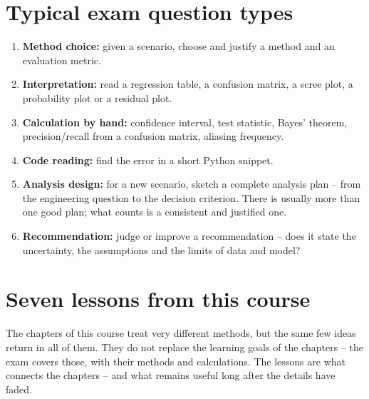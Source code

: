 \documentclass[
  letterpaper,
  DIV=11,
  numbers=noendperiod]{scrreprt}
\providecommand{\tightlist}{%
  \setlength{\itemsep}{0pt}\setlength{\parskip}{0pt}}\usepackage{longtable,booktabs,array}
\begin{document}
\section{Typical exam question types}\label{typical-exam-question-types}

\begin{enumerate}
\def\labelenumi{\arabic{enumi}.}
\tightlist
\item
  \textbf{Method choice:} given a scenario, choose and justify a method
  and an evaluation metric.
\item
  \textbf{Interpretation:} read a regression table, a confusion matrix,
  a scree plot, a probability plot or a residual plot.
\item
  \textbf{Calculation by hand:} confidence interval, test statistic,
  Bayes' theorem, precision/recall from a confusion matrix, aliasing
  frequency.
\item
  \textbf{Code reading:} find the error in a short Python snippet.
\item
  \textbf{Analysis design:} for a new scenario, sketch a complete
  analysis plan -- from the engineering question to the decision
  criterion. There is usually more than one good plan; what counts is a
  consistent and justified one.
\item
  \textbf{Recommendation:} judge or improve a recommendation -- does it
  state the uncertainty, the assumptions and the limits of data and
  model?
\end{enumerate}

\section{Seven lessons from this course}\label{sec-lessons}

The chapters of this course treat very different methods, but the same
few ideas return in all of them. They do not replace the learning goals
of the chapters -- the exam covers those, with their methods and
calculations. The lessons are what connects the chapters -- and what
remains useful long after the details have faded.
\end{document}
